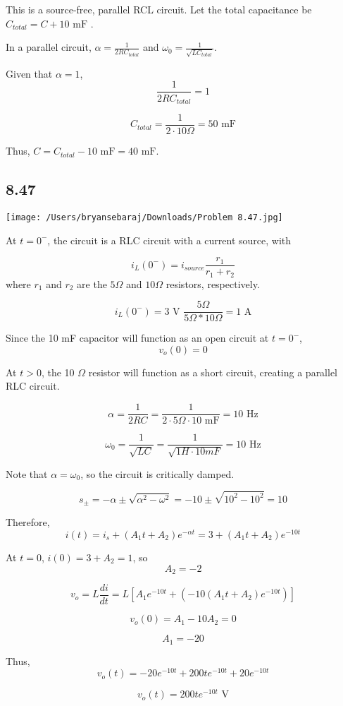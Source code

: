 \documentclass{article}
\begin{document}
This is a source-free, parallel RCL circuit. Let the total capacitance be $C_{total}=C + 10 \text{ mF }$.

In a parallel circuit, $\alpha = \frac{1}{2RC_{total}}$ and $\omega_0 = \frac{1}{\sqrt{LC_{total}}}$.

Given that $\alpha = 1$, $$\frac{1}{2RC_{total}}=1$$

$$C_{total}=\frac{1}{2 \cdot 10 \Omega}= 50 \text{ mF}$$

Thus, $C=C_{total} - 10 \text{ mF} = 40 \text{ mF}$.


\subsection*{8.47}

\texttt{[image: /Users/bryansebaraj/Downloads/Problem 8.47.jpg]}

At $t=0^-$, the circuit is a RLC circuit with a current source, with 

$$i_L(0^-)=i_{source}\frac{r_1}{r_1 + r_2}$$ where $r_1$ and $r_2$ are the $5 \Omega$ and $10 \Omega$ resistors, respectively.

$$i_L(0^-)=3 \text{ V } \frac{5 \Omega }{5 \Omega * 10 \Omega } = 1 \text{ A}$$

Since the 10 mF capacitor will function as an open circuit at $t = 0^-$, $$v_o(0)=0$$

At $t>0$, the 10 $\Omega$ resistor will function as a short circuit, creating a parallel RLC circuit. 

$$\alpha = \frac{1}{2RC}=\frac{1}{2\cdot 5 \Omega \cdot 10 \text{ mF}}=10 \text{ Hz}$$

$$\omega_0 = \frac{1}{\sqrt{LC}}=\frac{1}{\sqrt{1 H \cdot 10 { mF}}}=10 \text{ Hz}$$

Note that $\alpha = \omega_0$, so the circuit is critically damped.

$$s_{\pm} = -\alpha \pm \sqrt{\alpha^2 - \omega^2} = -10 \pm \sqrt{10^2 - 10^2} = 10$$

Therefore, $$i(t) = i_s + (A_1t + A_2)e^{-\alpha t} = 3 + (A_1t + A_2)e^{-10 t}$$

At $t=0$, $i(0)=3 + A_2 = 1$, so $$A_2 = -2$$

$$v_o = L \frac{di}{dt} = L [A_1e^{-10t} + (-10(A_1t+A_2)e^{-10t})] $$

$$v_o(0) = A_1 - 10A_2 = 0$$

$$A_1 = -20$$

Thus, $$v_o(t)=-20e^{-10t}+200te^{-10t}+20e^{-10t}$$

$$v_o(t)=200te^{-10t} \text{ V}$$
\end{document}
